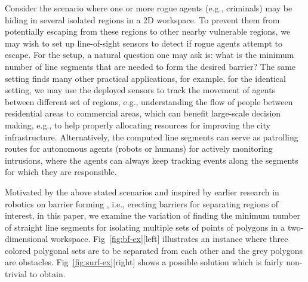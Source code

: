 Consider the scenario where one or more rogue agents (e.g., criminals) may be hiding in several isolated regions in a 2D workspace. To prevent them from potentially escaping from these regions to other nearby vulnerable regions, we may wish to set up line-of-sight sensors to detect if rogue agents attempt to escape. For the setup, a natural question one may ask is: what is the minimum number of line segments that are needed to form the desired barrier? The same setting finds many other practical applications, for example, for the identical setting, we may use the deployed sensors to track the movement of agents between different set of regions, e.g., understanding the flow of people between residential areas to commercial areas, which can benefit large-scale decision making, e.g., to help properly allocating resources for improving the city infrastructure. 
%
Alternatively, the computed line segments can serve as patrolling routes for autonomous agents (robots or humans) for actively monitoring intrusions, where the agents can always keep tracking events along the segments for which they are responsible.

%
Motivated by the above stated scenarios and inspired by earlier research in robotics on barrier forming \cite{kloder2007barrier,kloder2008partial}, i.e., erecting barriers for separating regions of interest, in this paper, we examine the variation of finding the minimum number of straight line segments for isolating multiple sets of points of polygons in a two-dimensional workspace. 
Fig~\ref{fig:bf-ex}[left] illustrates an instance where three colored polygonal sets are to be separated from each other and the grey polygons are obstacles. Fig~\ref{fig:surf-ex}[right] shows a possible solution which is fairly non-trivial 
to obtain. 
%


